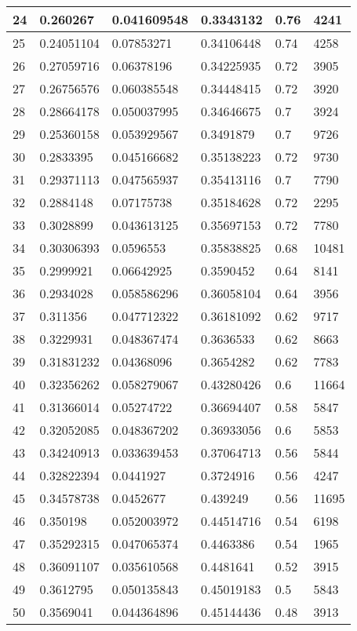 \begin{longtable}{|l|l|l|l|l|l|}
24 & 0.260267 & 0.041609548 & 0.3343132 & 0.76 & 4241 \\ \hline 
25 & 0.24051104 & 0.07853271 & 0.34106448 & 0.74 & 4258 \\ \hline 
26 & 0.27059716 & 0.06378196 & 0.34225935 & 0.72 & 3905 \\ \hline 
27 & 0.26756576 & 0.060385548 & 0.34448415 & 0.72 & 3920 \\ \hline 
28 & 0.28664178 & 0.050037995 & 0.34646675 & 0.7 & 3924 \\ \hline 
29 & 0.25360158 & 0.053929567 & 0.3491879 & 0.7 & 9726 \\ \hline 
30 & 0.2833395 & 0.045166682 & 0.35138223 & 0.72 & 9730 \\ \hline 
31 & 0.29371113 & 0.047565937 & 0.35413116 & 0.7 & 7790 \\ \hline 
32 & 0.2884148 & 0.07175738 & 0.35184628 & 0.72 & 2295 \\ \hline 
33 & 0.3028899 & 0.043613125 & 0.35697153 & 0.72 & 7780 \\ \hline 
34 & 0.30306393 & 0.0596553 & 0.35838825 & 0.68 & 10481 \\ \hline 
35 & 0.2999921 & 0.06642925 & 0.3590452 & 0.64 & 8141 \\ \hline 
36 & 0.2934028 & 0.058586296 & 0.36058104 & 0.64 & 3956 \\ \hline 
37 & 0.311356 & 0.047712322 & 0.36181092 & 0.62 & 9717 \\ \hline 
38 & 0.3229931 & 0.048367474 & 0.3636533 & 0.62 & 8663 \\ \hline 
39 & 0.31831232 & 0.04368096 & 0.3654282 & 0.62 & 7783 \\ \hline 
40 & 0.32356262 & 0.058279067 & 0.43280426 & 0.6 & 11664 \\ \hline 
41 & 0.31366014 & 0.05274722 & 0.36694407 & 0.58 & 5847 \\ \hline 
42 & 0.32052085 & 0.048367202 & 0.36933056 & 0.6 & 5853 \\ \hline 
43 & 0.34240913 & 0.033639453 & 0.37064713 & 0.56 & 5844 \\ \hline 
44 & 0.32822394 & 0.0441927 & 0.3724916 & 0.56 & 4247 \\ \hline 
45 & 0.34578738 & 0.0452677 & 0.439249 & 0.56 & 11695 \\ \hline 
46 & 0.350198 & 0.052003972 & 0.44514716 & 0.54 & 6198 \\ \hline 
47 & 0.35292315 & 0.047065374 & 0.4463386 & 0.54 & 1965 \\ \hline 
48 & 0.36091107 & 0.035610568 & 0.4481641 & 0.52 & 3915 \\ \hline 
49 & 0.3612795 & 0.050135843 & 0.45019183 & 0.5 & 5843 \\ \hline 
50 & 0.3569041 & 0.044364896 & 0.45144436 & 0.48 & 3913 \\ \hline 
\end{longtable}